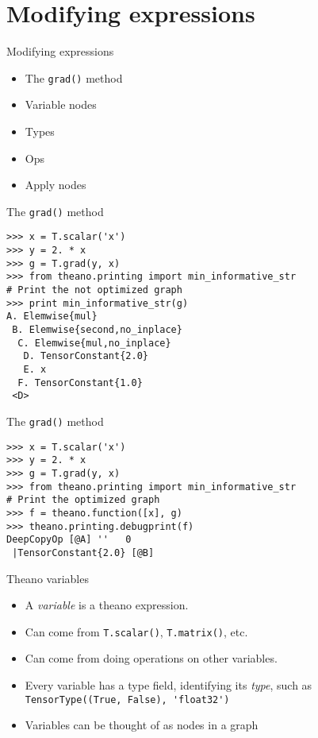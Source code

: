 \documentclass[utf8x,hyperref={pdfpagelabels=false}]{beamer}
\newcommand{\code}[1]{\lstinline[emph={[2]}]|#1|}
\begin{document}
\section{Modifying expressions}
\begin{frame}{Modifying expressions}
  \begin{itemize}
  \item The \code{grad()} method
  \item Variable nodes
  \item Types
  \item Ops
  \item Apply nodes
  \end{itemize}
\end{frame}

\begin{frame}[fragile]{The \code{grad()} method}
\begin{lstlisting}
>>> x = T.scalar('x')
>>> y = 2. * x
>>> g = T.grad(y, x)
>>> from theano.printing import min_informative_str
# Print the not optimized graph
>>> print min_informative_str(g)
A. Elemwise{mul}
 B. Elemwise{second,no_inplace}
  C. Elemwise{mul,no_inplace}
   D. TensorConstant{2.0}
   E. x
  F. TensorConstant{1.0}
 <D>
\end{lstlisting}
\end{frame}

\begin{frame}[fragile]{The \code{grad()} method}
\begin{lstlisting}
>>> x = T.scalar('x')
>>> y = 2. * x
>>> g = T.grad(y, x)
>>> from theano.printing import min_informative_str
# Print the optimized graph
>>> f = theano.function([x], g)
>>> theano.printing.debugprint(f)
DeepCopyOp [@A] ''   0
 |TensorConstant{2.0} [@B]
\end{lstlisting}
\end{frame}

\begin{frame}{Theano variables}
  \begin{itemize}
  \item A \emph{variable} is a theano expression.
  \item Can come from \code{T.scalar()}, \code{T.matrix()}, etc.
  \item Can come from doing operations on other variables.
  \item Every variable has a type field, identifying its \emph{type}, such as \code{TensorType((True, False), 'float32')}
  \item Variables can be thought of as nodes in a graph
  \end{itemize}
\end{frame}
\end{document}
